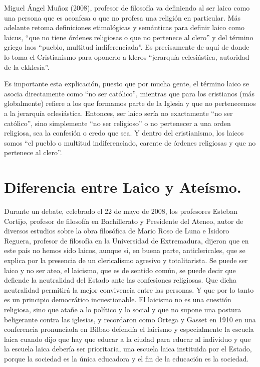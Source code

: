 Miguel Ángel Muñoz (2008), profesor de filosofía va definiendo al ser laico como una persona que es aconfesa o que no profesa una religión en particular. Más adelante retoma definiciones etimológicas y semánticas para definir laico como laicus, “que no tiene órdenes religiosas o que no pertenece al clero” y del término griego laos “pueblo, multitud indiferenciada”. Es precisamente de aquí de donde lo toma el Cristianismo para oponerlo a kleros “jerarquía eclesiástica, autoridad de la ekklesía”.

Es importante esta explicación, puesto que por mucha gente, el término laico se asocia directamente como “no ser católico”, mientras que para los cristianos (más globalmente) refiere a los que formamos parte de la Iglesia y que no pertenecemos a la jerarquía eclesiástica. Entonces, ser laico sería no exactamente “no ser católico”, sino simplemente “no ser religioso” o no pertenecer a una orden religiosa, sea la confesión o credo que sea. Y dentro del cristianismo, los laicos somos “el pueblo o multitud indiferenciado, carente de órdenes religiosas y que no pertenece al clero”.
\section{Diferencia entre Laico y Ateísmo.}
Durante un debate, celebrado el 22 de mayo de 2008, los profesores Esteban Cortijo, profesor de filosofía en Bachillerato y Presidente del Ateneo, autor de diversos estudios sobre la obra filosófica de Mario Roso de Luna e Isidoro Reguera, profesor de filosofía en la Universidad de Extremadura, dijeron que en este país no hemos sido laicos, aunque sí, en buena parte, anticlericales, que se explica por la presencia de un clericalismo agresivo y totalitarista. Se puede ser laico y no ser ateo, el laicismo, que es de sentido común, se puede decir que defiende la neutralidad del Estado ante las confesiones religiosas. Que dicha neutralidad permitirá la mejor convivencia entre las personas. Y que por lo tanto es un principio democrático incuestionable. El laicismo no es una cuestión religiosa, sino que atañe a lo político y lo social y que no supone una postura beligerante contra las iglesias, y recordaron como Ortega y Gasset en 1910 en una conferencia pronunciada en Bilbao defendía el laicismo y especialmente la escuela laica cuando dijo que hay que educar a la ciudad para educar al individuo y que la escuela laica debería ser prioritaria, una escuela laica instituida por el Estado, porque la sociedad es la única educadora y el fin de la educación es la sociedad.

